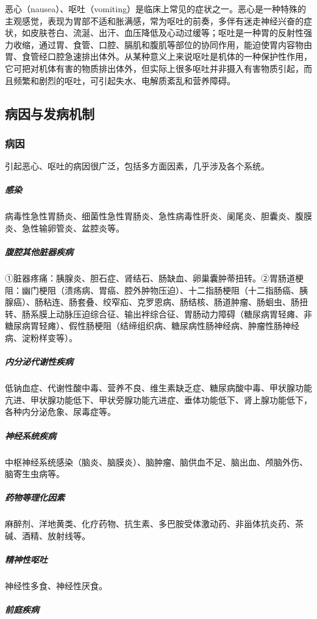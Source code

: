 恶心（nausea）、呕吐（vomiting）是临床上常见的症状之一。恶心是一种特殊的主观感觉，表现为胃部不适和胀满感，常为呕吐的前奏，多伴有迷走神经兴奋的症状，如皮肤苍白、流涎、出汗、血压降低及心动过缓等；呕吐是一种胃的反射性强力收缩，通过胃、食管、口腔、膈肌和腹肌等部位的协同作用，能迫使胃内容物由胃、食管经口腔急速排出体外。从某种意义上来说呕吐是机体的一种保护性作用，它可把对机体有害的物质排出体外，但实际上很多呕吐并非摄入有害物质引起，而且频繁和剧烈的呕吐，可引起失水、电解质紊乱和营养障碍。

\subsection{病因与发病机制}

\subsubsection{病因}

引起恶心、呕吐的病因很广泛，包括多方面因素，几乎涉及各个系统。

\subparagraph{感染}

病毒性急性胃肠炎、细菌性急性胃肠炎、急性病毒性肝炎、阑尾炎、胆囊炎、腹膜炎、急性输卵管炎、盆腔炎等。

\subparagraph{腹腔其他脏器疾病}

①脏器疼痛：胰腺炎、胆石症、肾结石、肠缺血、卵巢囊肿蒂扭转。②胃肠道梗阻：幽门梗阻（溃疡病、胃癌、腔外肿物压迫）、十二指肠梗阻（十二指肠癌、胰腺癌）、肠粘连、肠套叠、绞窄疝、克罗恩病、肠结核、肠道肿瘤、肠蛔虫、肠扭转、肠系膜上动脉压迫综合征、输出袢综合征、胃肠动力障碍（糖尿病胃轻瘫、非糖尿病胃轻瘫）、假性肠梗阻（结缔组织病、糖尿病性肠神经病、肿瘤性肠神经病、淀粉样变等）。

\subparagraph{内分泌代谢性疾病}

低钠血症、代谢性酸中毒、营养不良、维生素缺乏症、糖尿病酸中毒、甲状腺功能亢进、甲状腺功能低下、甲状旁腺功能亢进症、垂体功能低下、肾上腺功能低下，各种内分泌危象、尿毒症等。

\subparagraph{神经系统疾病}

中枢神经系统感染（脑炎、脑膜炎）、脑肿瘤、脑供血不足、脑出血、颅脑外伤、脑寄生虫病等。

\subparagraph{药物等理化因素}

麻醉剂、洋地黄类、化疗药物、抗生素、多巴胺受体激动药、非甾体抗炎药、茶碱、酒精、放射线等。

\subparagraph{精神性呕吐}

神经性多食、神经性厌食。

\subparagraph{前庭疾病}

